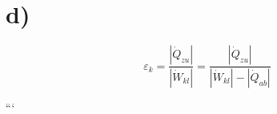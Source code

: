 

\section*{d)}

\[
\varepsilon_k = \frac{|\dot{Q}_{zu}|}{|\dot{W}_{kl}|} = \frac{|\dot{Q}_{zu}|}{|\dot{W}_{kl}| - |\dot{Q}_{ab}|}
\]

```